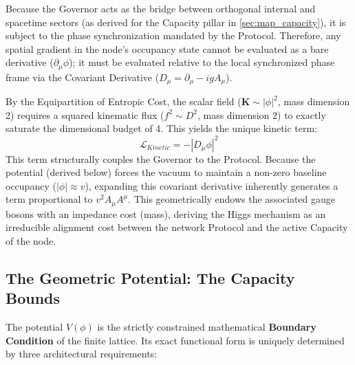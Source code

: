 Because the Governor acts as the bridge between orthogonal internal and spacetime sectors (as derived for the Capacity pillar in \cref{sec:map_capacity}), it is subject to the phase synchronization mandated by the Protocol. Therefore, any spatial gradient in the node's occupancy state cannot be evaluated as a bare derivative ($\partial_\mu \phi$); it must be evaluated relative to the local synchronized phase frame via the Covariant Derivative ($D_\mu = \partial_\mu - igA_\mu$). 

By the Equipartition of Entropic Cost, the scalar field ($\mathbf{K} \sim |\phi|^2$, mass dimension 2) requires a squared kinematic flux ($f^2 \sim D^2$, mass dimension 2) to exactly saturate the dimensional budget of 4. This yields the unique kinetic term:
\begin{equation}
    \mathcal{L}_{Kinetic} = -|D_\mu \phi|^2
\end{equation}
This term structurally couples the Governor to the Protocol. Because the potential (derived below) forces the vacuum to maintain a non-zero baseline occupancy ($|\phi| \approx v$), expanding this covariant derivative inherently generates a term proportional to $v^2 A_\mu A^\mu$. This geometrically endows the associated gauge bosons with an impedance cost (mass), deriving the Higgs mechanism as an irreducible alignment cost between the network Protocol and the active Capacity of the node.

\subsection{The Geometric Potential: The Capacity Bounds}

The potential $V(\phi)$ is the strictly constrained mathematical \textbf{Boundary Condition} of the finite lattice. Its exact functional form is uniquely determined by three architectural requirements:

